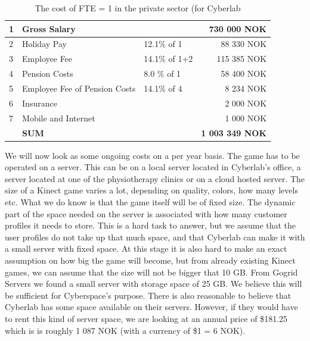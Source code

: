 \begin{table}
\centering
    \begin{tabular}{|l|l|l|r|}
        \hline
       1&Gross Salary & & 730 000 NOK \\ \hline
       2&Holiday Pay & 12.1\% of 1  & 88 330 NOK \\ \hline
	   3&Employee Fee & 14.1\% of 1+2  & 115 385 NOK \\ \hline
	   4&Pension Costs & 8.0 \% of 1 & 58 400 NOK\\ \hline
	   5&Employee Fee of Pension Costs & 14.1\% of 4 & 8 234 NOK \\ \hline
	   6&Insurance & & 2 000 NOK \\ \hline
	   7&Mobile and Internet & & 1 000 NOK \\ \hline
	   & \textbf{SUM} & & \textbf{1 003 349 NOK} \\
	    \hline
    \end{tabular}
    \caption[Cost of FTE = 1]{The cost of FTE = 1 in the private sector (for Cyberlab}
    \label{tab:costofFTE}
\end{table} 
We will now look as some ongoing costs on a per year basis. The game has to be operated on a server. This can be on a local server located in Cyberlab’s office, a server located at one of the physiotherapy clinics or on a cloud hosted server. The size of a Kinect game varies a lot, depending on quality, colors, how many levels etc. What we do know is that the game itself will be of fixed size. The dynamic part of the space needed on the server is associated with how many customer profiles it needs to store. This is a hard task to answer, but we assume that the user profiles do not take up that much space, and that Cyberlab can make it with a small server with fixed space. At this stage it is also hard to make an exact assumption on how big the game will become, but from already existing Kinect games, we can assume that the size will not be bigger that 10 GB. From Gogrid Servers \cite{priceserver} we found a small server with storage space of 25 GB. We believe this will be sufficient for Cyberspace's purpose. There is also reasonable to believe that Cyberlab has some space available on their servers. However, if they would have to rent this kind of server space, we are looking at an annual price of \$181.25 which is is roughly 1 087 NOK (with a currency of \$1 = 6 NOK).\\ \\
